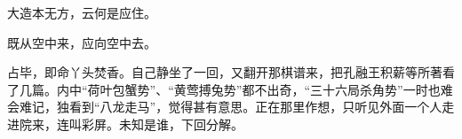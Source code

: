 \begin{poem}
    \begin{pl}
        大造本无方，云何是应住。
    \end{pl}


    \begin{pl}
        既从空中来，应向空中去。
    \end{pl}
\end{poem}


\begin{parag}
    占毕，即命丫头焚香。自己静坐了一回，又翻开那棋谱来，把孔融王积薪等所著看了几篇。内中“荷叶包蟹势”、“黄莺搏兔势”都不出奇，“三十六局杀角势”一时也难会难记，独看到“八龙走马”，觉得甚有意思。正在那里作想，只听见外面一个人走进院来，连叫彩屏。未知是谁，下回分解。
\end{parag}